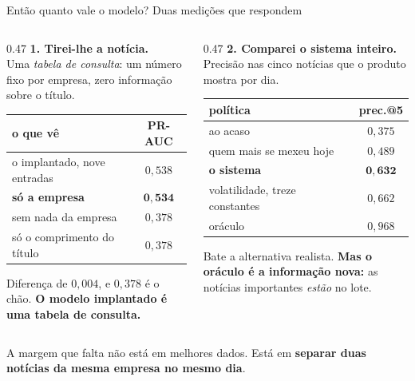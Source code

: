 \documentclass[aspectratio=169]{beamer}
\begin{document}
\begin{frame}{Então quanto vale o modelo? Duas medições que respondem}
\small
\begin{columns}[T]
\begin{column}{0.47\textwidth}
\textbf{1. Tirei-lhe a notícia.}\\[1mm]
{\scriptsize Uma \emph{tabela de consulta}: um número fixo por empresa, zero informação sobre o
título.}
\vspace{1mm}
\begin{center}\scriptsize
\begin{tabular}{lc}
\toprule
\textbf{o que vê} & \textbf{PR-AUC} \\
\midrule
o implantado, nove entradas & $0{,}538$ \\
\textbf{só a empresa} & $\mathbf{0{,}534}$ \\
sem nada da empresa & $0{,}378$ \\
só o comprimento do título & $0{,}378$ \\
\bottomrule
\end{tabular}
\end{center}
\vspace{1mm}
{\scriptsize Diferença de $0{,}004$, e $0{,}378$ é o chão. \textbf{O modelo implantado é uma tabela de
consulta.}}
\end{column}
\begin{column}{0.47\textwidth}
\textbf{2. Comparei o sistema inteiro.}\\[1mm]
{\scriptsize Precisão nas cinco notícias que o produto mostra por dia.}
\vspace{1mm}
\begin{center}\scriptsize
\begin{tabular}{lc}
\toprule
\textbf{política} & \textbf{prec.@5} \\
\midrule
ao acaso & $0{,}375$ \\
quem mais se mexeu hoje & $0{,}489$ \\
\textbf{o sistema} & $\mathbf{0{,}632}$ \\
volatilidade, treze constantes & $0{,}662$ \\
oráculo & $0{,}968$ \\
\bottomrule
\end{tabular}
\end{center}
\vspace{1mm}
{\scriptsize Bate a alternativa realista. \textbf{Mas o oráculo é a informação nova:} as notícias
importantes \emph{estão} no lote.}
\end{column}
\end{columns}
\vspace{2mm}
\begin{center}
A margem que falta não está em melhores dados. Está em \textbf{separar duas notícias da mesma
empresa no mesmo dia}.
\end{center}
\end{frame}
\end{document}
